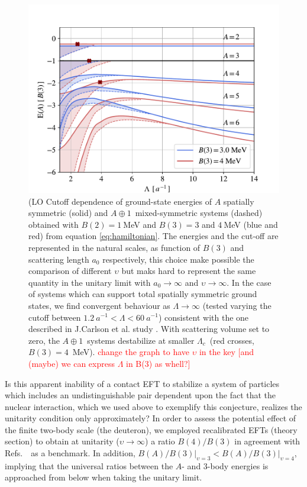 \documentclass[preprint,12pt]{elsarticle}
\newcommand{\lc}{\ensuremath{\Lambda_c}}
\newcommand{\abb}{\mbox{\ensuremath{A\oplus 1}}}
\newcommand{\red}[1]{\textcolor{red}{#1}}
\begin{document}
%
\begin{figure}
    \centering
        \centering
        \includegraphics[width=\linewidth]{./p-systems-vs-l} 
        \caption{(LO Cutoff dependence of ground-state energies of $A$ spatially symmetric (solid) and \abb~mixed-symmetric systems
        (dashed) obtained with $B(2)=1~$MeV and $B(3)=3$ and $4~$MeV (blue and red) from equation \ref{eq:hamiltonian}. 
        The energies and the cut-off are represented in the natural scales, as function of $B(3)$ and scattering length $a_0$ respectively, this choice make possible the comparison of different $\upsilon$ but maks hard to represent the same quantity in the unitary limit with $a_0\rightarrow\infty$ and $\upsilon\rightarrow\infty$. 
        In the case of systems which can support total spatially symmetric ground states, we find convergent behaviour as $\Lambda\to\infty$ (tested varying the cutoff between $1.2~a^{-1}<\Lambda<60~a^{-1}$) consistent with the one described in J.Carlson et al. study \cite{manybosons}.
        With scattering volume set to zero, the \abb~systems destabilize at smaller \lc~(red crosses, $B(3)=4$~MeV). 
        \red{change the graph to have $\upsilon$ in the key [and (maybe) we can express $\Lambda$ in B(3) as whell?] }}
        \label{fig:threshold}
\end{figure} 
%

Is this apparent inability of a contact EFT to stabilize a system of particles
which includes an undistinguishable pair dependent upon the fact that the nuclear interaction,
which we used above to exemplify this conjecture, realizes the unitarity condition only
approximately?
In order to assess the potential effect of the finite two-body scale (the deuteron),
we employed recalibrated EFTs (theory section) to obtain
at unitarity ($\upsilon\rightarrow \infty$) a ratio $B(4)/B(3)$ in agreement with 
Refs.~\cite{Hammer:2006ct,2009NatPh...5..417V}~as a benchmark.
In addition, \mbox{$B(A)/B(3)\Big\vert_{\upsilon=3}<B(A)/B(3)\Big\vert_{\upsilon=4}$}, implying that the universal ratios between the $A$- and 3-body energies is approached from below when taking the unitary limit.
\end{document}
